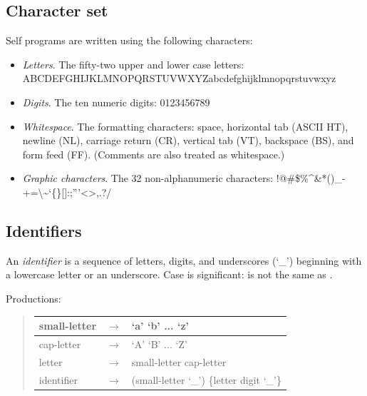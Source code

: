 \documentclass[letterpaper,10pt,english]{sphinxmanual}
\begin{document}

\subsection{Character set}
\label{langref:index-56}\label{langref:character-set}
Self programs are written using the following characters:
\begin{itemize}
\item {} 
\emph{Letters}. The fifty-two upper and lower case letters: ABCDEFGHIJKLMNOPQRSTUVWXYZabcdefghijklmnopqrstuvwxyz

\item {} 
\emph{Digits}. The ten numeric digits: 0123456789

\item {} 
\emph{Whitespace}. The formatting characters: space, horizontal tab (ASCII HT), newline (NL), carriage return (CR), vertical tab (VT), backspace (BS), and form feed (FF). (Comments are also treated as whitespace.)

\item {} 
\emph{Graphic characters}. The 32 non-alphanumeric characters: !@\#\$\%\textasciicircum{}\&*()\_-+=\textbar{}\textbackslash{}\textasciitilde{}‘\{\}{[}{]}:;''’\textless{}\textgreater{},.?/

\end{itemize}


\subsection{Identifiers}
\label{langref:identifiers}\label{langref:index-60}
An \emph{identifier} is a sequence of letters, digits, and underscores (‘\_’) beginning with a lowercase letter or an underscore. Case is significant:  is not the same as .

Productions:
\begin{quote}

\begin{tabulary}{\linewidth}{|L|L|L|}
\hline

small-letter
 & 
\(\rightarrow\)
 & 
‘a’ \textbar{} ‘b’ \textbar{} ... \textbar{} ‘z’
\\\hline

cap-letter
 & 
\(\rightarrow\)
 & 
‘A’ \textbar{} ‘B’ \textbar{} ... \textbar{} ‘Z’
\\\hline

letter
 & 
\(\rightarrow\)
 & 
small-letter \textbar{} cap-letter
\\\hline

identifier
 & 
\(\rightarrow\)
 & 
(small-letter \textbar{} ‘\_’) \{letter \textbar{} digit \textbar{} ‘\_’\}
\\\hline
\end{tabulary}

\end{quote}
\end{document}
